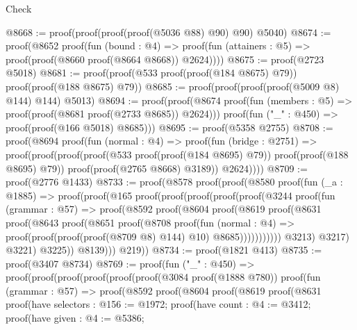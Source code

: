 \begin{lexlean}{Check}
\begin{coremodule}
@8668 := proof(proof(proof(proof(@5036 @88) @90) @90) @5040)
@8674 := proof(@8652
      proof(fun (bound : @4) =>
        proof(fun (attainers : @5) => proof(proof(@8660 proof(@8664 @8668)) @2624))))
@8675 := proof(@2723 @5018)
@8681 := proof(proof(@533 proof(proof(@184 @8675) @79)) proof(proof(@188 @8675) @79))
@8685 := proof(proof(proof(proof(@5009 @8) @144) @144) @5013)
@8694 := proof(proof(@8674
        proof(fun (members : @5) => proof(proof(@8681 proof(@2733 @8685)) @2624)))
      proof(fun ("_" : @450) => proof(proof(@166 @5018) @8685)))
@8695 := proof(@5358 @2755)
@8708 := proof(@8694
      proof(fun (normal : @4) =>
        proof(fun (bridge : @2751) =>
          proof(proof(proof(proof(@533 proof(proof(@184 @8695) @79)) proof(proof(@188 @8695) @79))
                proof(proof(@2765 @8668) @3189))
              @2624))))
@8709 := proof(@2776 @1433)
@8733 := proof(@8578
      proof(proof(@8580
            proof(fun (_a : @1885) =>
              proof(proof(@165
                    proof(proof(proof(proof(proof(@3244
                                proof(fun (grammar : @57) =>
                                  proof(@8592
                                      proof(@8604
                                          proof(@8619
                                              proof(@8631
                                                  proof(@8643
                                                      proof(@8651
                                                          proof(@8708
                                                              proof(fun (normal : @4) =>
                                                                proof(proof(proof(proof(@8709 @8)
                                                                        @144)
                                                                      @10)
                                                                    @8685)))))))))))
                              @3213)
                            @3217)
                          @3221)
                        @3225))
                  @8139)))
          @219))
@8734 := proof(@1821 @413)
@8735 := proof(@3407 @8734)
@8769 := proof(fun ("_" : @450) =>
    proof(proof(proof(proof(proof(proof(@3084 proof(@1888 @780))
                proof(fun (grammar : @57) =>
                  proof(@8592
                      proof(@8604
                          proof(@8619
                              proof(@8631
                                  proof(have selectors : @156 := @1972;
                                    proof(have count : @4 := @3412;
                                      proof(have given : @4 := @5386;

\end{coremodule}
\end{lexlean}

